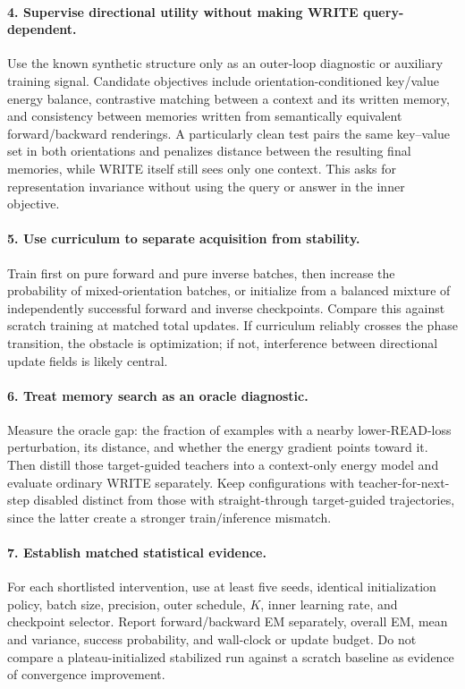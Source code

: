 \documentclass{article}
\begin{document}
\paragraph{4. Supervise directional utility without making WRITE query-dependent.}
Use the known synthetic structure only as an outer-loop diagnostic or auxiliary training signal.  Candidate objectives include orientation-conditioned key/value energy balance, contrastive matching between a context and its written memory, and consistency between memories written from semantically equivalent forward/backward renderings.  A particularly clean test pairs the same key--value set in both orientations and penalizes distance between the resulting final memories, while WRITE itself still sees only one context.  This asks for representation invariance without using the query or answer in the inner objective.

\paragraph{5. Use curriculum to separate acquisition from stability.}
Train first on pure forward and pure inverse batches, then increase the probability of mixed-orientation batches, or initialize from a balanced mixture of independently successful forward and inverse checkpoints.  Compare this against scratch training at matched total updates.  If curriculum reliably crosses the phase transition, the obstacle is optimization; if not, interference between directional update fields is likely central.

\paragraph{6. Treat memory search as an oracle diagnostic.}
Measure the oracle gap: the fraction of examples with a nearby lower-READ-loss perturbation, its distance, and whether the energy gradient points toward it.  Then distill those target-guided teachers into a context-only energy model and evaluate ordinary WRITE separately.  Keep configurations with teacher-for-next-step disabled distinct from those with straight-through target-guided trajectories, since the latter create a stronger train/inference mismatch.

\paragraph{7. Establish matched statistical evidence.}
For each shortlisted intervention, use at least five seeds, identical initialization policy, batch size, precision, outer schedule, $K$, inner learning rate, and checkpoint selector.  Report forward/backward EM separately, overall EM, mean and variance, success probability, and wall-clock or update budget.  Do not compare a plateau-initialized stabilized run against a scratch baseline as evidence of convergence improvement.
\end{document}
